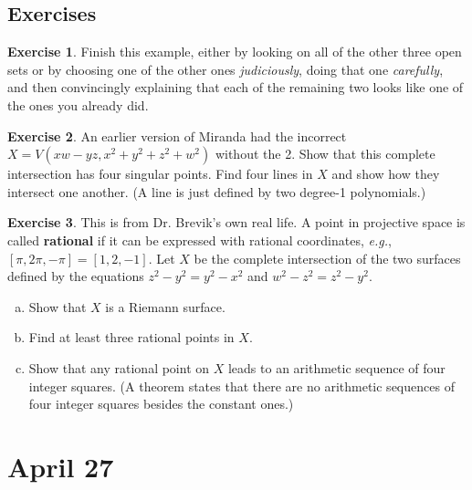 \documentclass[12pt]{article}
\newcommand{\ita}[1]{\textit{#1}}
\theoremstyle{definition}
\newtheorem{exercise}{Exercise}
\theoremstyle{remark}
\begin{document}
\subsection{Exercises}
\begin{exercise}
    Finish this example, either by looking on all of the other three open sets or by choosing one of the other ones \ita{judiciously}, doing that one \ita{carefully}, and then convincingly explaining that each of the remaining two looks like one of the ones you already did.
\end{exercise}
\begin{exercise}
    An earlier version of Miranda had the incorrect $X = V(xw - yz , x^2 + y^2 + z^2 + w^2)$ without the 2. Show that this complete intersection has four singular points. Find four lines in $X$ and show how they intersect one another. (A line is just defined by two degree-1 polynomials.)
\end{exercise}
\begin{exercise}
    This is from Dr. Brevik's own real life. A point in projective space is called \textbf{rational} if it can be expressed with rational coordinates, \ita{e.g.}, $[\pi , 2\pi , -\pi] = [1,2,-1]$. Let $X$ be the complete intersection of the two surfaces defined by the equations $z^2 - y^2 = y^2 - x^2$ and $w^2 - z^2 = z^2 - y^2$.
    \begin{enumerate}[(a)]
        \item Show that $X$ is a Riemann surface.
        \item Find at least three rational points in $X$.
        \item Show that any rational point on $X$ leads to an arithmetic sequence of four integer squares. (A theorem states that there are no arithmetic sequences of four integer squares besides the constant ones.)
    \end{enumerate}
\end{exercise}

\section{April 27}
\end{document}
